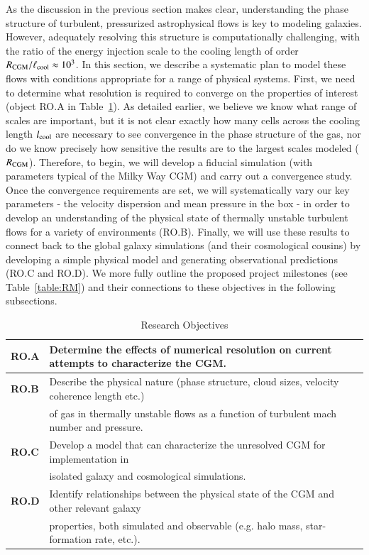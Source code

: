 \documentclass[11pt,letterpaper,english]{article}
\begin{document}
As the discussion in the previous section makes clear, understanding the phase structure of turbulent, pressurized astrophysical flows is key to modeling galaxies. However, adequately resolving this structure is computationally challenging, with the ratio of the energy injection scale to the cooling length of order $R_{\rm CGM}/\ell_{\rm cool} \approx 10^3$.  In this section, we describe a systematic plan to model these flows with conditions appropriate for a range of physical systems. First, we need to determine what resolution is required to converge on the properties of interest (object RO.A in Table~\ref{table:RO}).  As detailed earlier, we believe we know what range of scales are important, but it is not clear exactly how many cells across the cooling length $l_{\rm cool}$ are necessary to see convergence in the phase structure of the gas, nor do we know precisely how sensitive the results are to the largest scales modeled ($R_{\rm CGM}$).  Therefore, to begin, we will develop a fiducial simulation (with parameters typical of the Milky Way CGM) and carry out a convergence study.  Once the convergence requirements are set, we will systematically vary our key parameters - the velocity dispersion and mean pressure in the box - in order to develop an understanding of the physical state of thermally unstable turbulent flows for a variety of environments (RO.B). Finally, we will use these results to connect back to the global galaxy simulations (and their cosmological cousins) by developing a simple physical model and generating observational predictions (RO.C and RO.D). We more fully outline the proposed project milestones (see Table~\ref{table:RM}) and their connections to these objectives in the following subsections.


\begin{table}[h]
\caption{Research Objectives}
\label{table:RO}
\begin{tabular}{|l|l|}
\hline
\textbf{RO.A} & Determine the effects of numerical resolution on current attempts to characterize the CGM. \\ \hline
\textbf{RO.B} & Describe the physical nature (phase structure, cloud sizes, velocity coherence length etc.) \\
& of gas in thermally unstable flows as a function of turbulent mach number and pressure. \\ \hline
\textbf{RO.C} & Develop a model that can characterize the unresolved CGM for implementation in  \\
& isolated galaxy and cosmological simulations. \\ \hline
\textbf{RO.D} & Identify relationships between the physical state of the CGM and other relevant galaxy \\ 
& properties, both simulated and observable (e.g. halo mass, star-formation rate, etc.). \\
\hline
\end{tabular}
\end{table}
\end{document}

